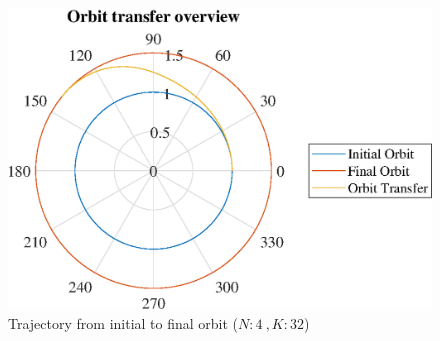 \documentclass[]{article}
\begin{document}
	\begin{figure}
		\centering
		\includegraphics[scale=0.75]{orbit_N4_K32_C2_tf.eps}
		\caption{Trajectory from initial to final orbit (\(N:4\ , K:32\))}
		\label{fig:orbit_N4_K32_C2_tf}
	\end{figure}
	
	\FloatBarrier
\end{document}
